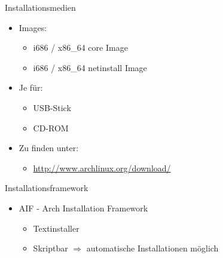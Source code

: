 
\begin{slide}{Installationsmedien}
	\begin{itemize}
		\item{Images:
			\begin{itemize}
				\item{i686 / x86\_64 core Image}
				\item{i686 / x86\_64 netinstall Image}
			\end{itemize}
		}
		
		\item{Je f\"{u}r:
			\begin{itemize}
				\item{USB-Stick}
				\item{CD-ROM}
			\end{itemize}
		}
		\item{Zu finden unter:
			\begin{itemize}
				\item{\url{http://www.archlinux.org/download/}}
			\end{itemize}
		}
	\end{itemize}
\end{slide}

\begin{slide}{Installationsframework}
	\begin{itemize}
		\item{AIF - Arch Installation Framework
			\begin{itemize}
				\item{Textinstaller}
				\item{Skriptbar $\Rightarrow{}$ automatische Installationen m\"{o}glich}
			\end{itemize}
		}
	\end{itemize}
\end{slide}

